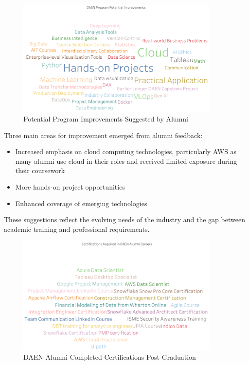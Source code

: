 \documentclass[12pt,a4paper]{article}
\begin{document}
\begin{figure}[H]
    \centering
    \includegraphics[width=0.9\textwidth]{visualizations/potential-improvements.png}
    \caption{Potential Program Improvements Suggested by Alumni}
    \label{fig:potential-improvements}
\end{figure}

Three main areas for improvement emerged from alumni feedback:
\begin{itemize}
\item Increased emphasis on cloud computing technologies, particularly AWS as many alumni use cloud in their roles and received limited exposure during their coursework
\item More hands-on project opportunities
\item Enhanced coverage of emerging technologies
\end{itemize}

These suggestions reflect the evolving needs of the industry and the gap between academic training and professional requirements.

\begin{figure}[H]
    \centering
    \includegraphics[width=0.9\textwidth]{visualizations/daen-alumni-completed-certs.png}
    \caption{DAEN Alumni Completed Certifications Post-Graduation}
    \label{fig:completed-certifications}
\end{figure}
\end{document}
